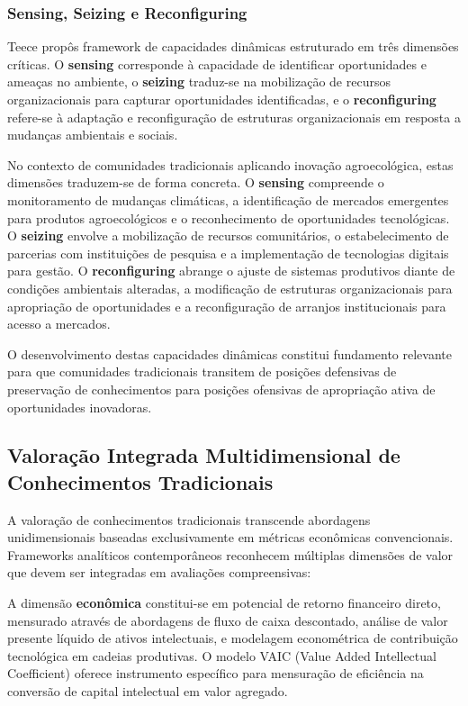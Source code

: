 \subsubsection{Sensing, Seizing e Reconfiguring}

Teece \cite{Teece2007} propôs framework de capacidades dinâmicas estruturado em três dimensões críticas. O \textbf{sensing} corresponde à capacidade de identificar oportunidades e ameaças no ambiente, o \textbf{seizing} traduz-se na mobilização de recursos organizacionais para capturar oportunidades identificadas, e o \textbf{reconfiguring} refere-se à adaptação e reconfiguração de estruturas organizacionais em resposta a mudanças ambientais e sociais.

No contexto de comunidades tradicionais aplicando inovação agroecológica, estas dimensões traduzem-se de forma concreta. O \textbf{sensing} compreende o monitoramento de mudanças climáticas, a identificação de mercados emergentes para produtos agroecológicos e o reconhecimento de oportunidades tecnológicas. O \textbf{seizing} envolve a mobilização de recursos comunitários, o estabelecimento de parcerias com instituições de pesquisa e a implementação de tecnologias digitais para gestão. O \textbf{reconfiguring} abrange o ajuste de sistemas produtivos diante de condições ambientais alteradas, a modificação de estruturas organizacionais para apropriação de oportunidades e a reconfiguração de arranjos institucionais para acesso a mercados.

O desenvolvimento destas capacidades dinâmicas constitui fundamento relevante para que comunidades tradicionais transitem de posições defensivas de preservação de conhecimentos para posições ofensivas de apropriação ativa de oportunidades inovadoras.

\subsection{Valoração Integrada Multidimensional de Conhecimentos Tradicionais}

A valoração de conhecimentos tradicionais transcende abordagens unidimensionais baseadas exclusivamente em métricas econômicas convencionais. Frameworks analíticos contemporâneos reconhecem múltiplas dimensões de valor que devem ser integradas em avaliações compreensivas:

A dimensão \textbf{econômica} constitui-se em potencial de retorno financeiro direto, mensurado através de abordagens de fluxo de caixa descontado, análise de valor presente líquido de ativos intelectuais, e modelagem econométrica de contribuição tecnológica em cadeias produtivas. O modelo VAIC (Value Added Intellectual Coefficient) \cite{Pulic2000} oferece instrumento específico para mensuração de eficiência na conversão de capital intelectual em valor agregado.

